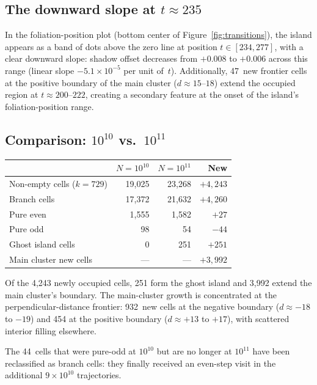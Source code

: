 \documentclass[11pt]{article}
\begin{document}
\subsection{The downward slope at $t \approx 235$}

In the foliation-position plot (bottom center of Figure~\ref{fig:transitions}),
the island appears as a band of dots above the zero line at
position $t \in [234, 277]$, with a clear downward slope:
shadow offset decreases from $+0.008$ to $+0.006$ across this range
(linear slope $-5.1 \times 10^{-5}$ per unit of~$t$).  Additionally,
47~new frontier cells at the positive boundary of the main cluster
($d \approx 15$--$18$) extend the occupied region at $t \approx 200$--$222$,
creating a secondary feature at the onset of the island's
foliation-position range.

\subsection{Comparison: $10^{10}$ vs.\ $10^{11}$}

\begin{center}
\begin{tabular}{lrrr}
\toprule
& $N = 10^{10}$ & $N = 10^{11}$ & New \\
\midrule
Non-empty cells ($k = 729$) & 19{,}025 & 23{,}268 & $+4{,}243$ \\
Branch cells & 17{,}372 & 21{,}632 & $+4{,}260$ \\
Pure even & 1{,}555 & 1{,}582 & $+27$ \\
Pure odd & 98 & 54 & $-44$ \\
\midrule
Ghost island cells & 0 & 251 & $+251$ \\
Main cluster new cells & --- & --- & $+3{,}992$ \\
\bottomrule
\end{tabular}
\end{center}

Of the 4{,}243 newly occupied cells, 251 form the ghost island
and 3{,}992 extend the main cluster's boundary.  The main-cluster
growth is concentrated at the perpendicular-distance frontier:
932~new cells at the negative boundary ($d \approx -18$ to $-19$)
and 454 at the positive boundary ($d \approx +13$ to $+17$), with
scattered interior filling elsewhere.

The 44~cells that were pure-odd at $10^{10}$ but are no longer at
$10^{11}$ have been reclassified as branch cells: they finally
received an even-step visit in the additional $9 \times 10^{10}$
trajectories.
\end{document}
